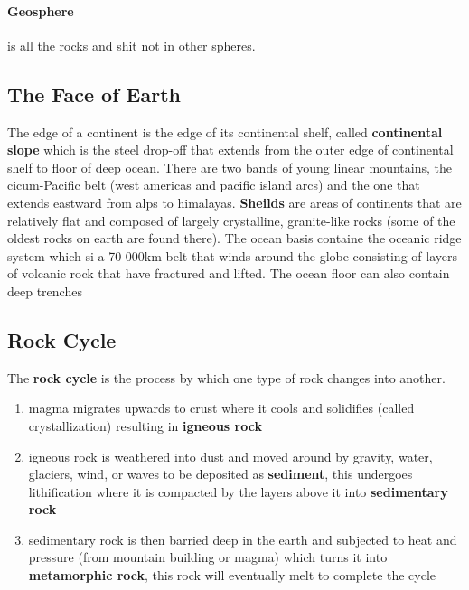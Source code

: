 \documentclass{article}
\begin{document}
\paragraph{Geosphere} is all the rocks and shit not in other spheres.


\subsection{The Face of Earth} %
\label{sub:the_face_of_earth}
The edge of a continent is the edge of its continental shelf, called \textbf{continental slope} which is the steel drop-off that extends from the outer edge of continental shelf to floor of deep ocean. There are two bands of young linear mountains, the cicum-Pacific belt (west americas and pacific island arcs) and the one that extends eastward from alps to himalayas. \textbf{Sheilds} are areas of continents that are relatively flat and composed of largely crystalline, granite-like rocks (some of the oldest rocks on earth are found there). The ocean basis containe the oceanic ridge system which si a 70 000km belt that winds around the globe consisting of layers of volcanic rock that have fractured and lifted. The ocean floor can also contain deep trenches

\subsection{Rock Cycle} %
\label{sub:rock_cycle}
The \textbf{rock cycle} is the process by which one type of rock changes into another.

\begin{enumerate}
    \item magma migrates upwards to crust where it cools and solidifies (called crystallization) resulting in \textbf{igneous rock}
    \item igneous rock is weathered into dust and moved around by gravity, water, glaciers, wind, or waves to be deposited as \textbf{sediment}, this undergoes lithification where it is compacted by the layers above it into \textbf{sedimentary rock}
    \item sedimentary rock is then barried deep in the earth and subjected to heat and pressure (from mountain building or magma) which turns it into \textbf{metamorphic rock}, this rock will eventually melt to complete the cycle
\end{enumerate}
\end{document}
